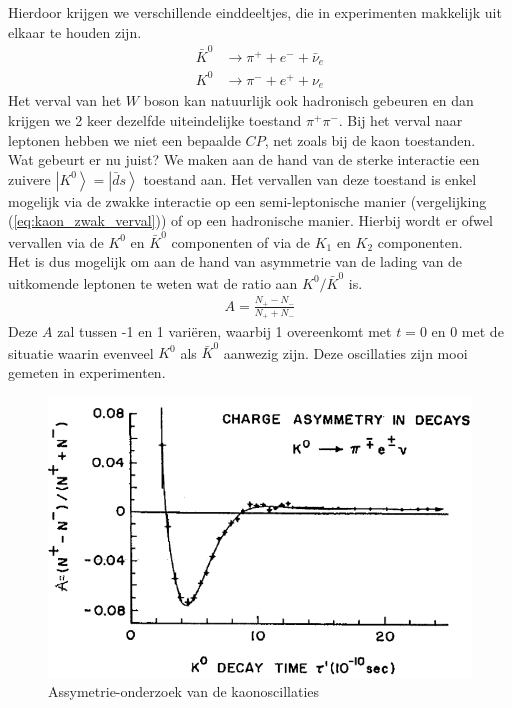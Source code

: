 \documentclass[../main.tex]{subfiles}
\begin{document}
Hierdoor krijgen we verschillende einddeeltjes, die in experimenten makkelijk uit elkaar te houden zijn.
\begin{equation}
    \begin{aligned}
        \label{eq:kaon_zwak_verval}
        \bar{K}^{0} &\rightarrow \pi^{+}+e^{-}+\bar{\nu}_{e} \\
        K^{0} &\rightarrow \pi^{-}+e^{+}+\nu_{e}
    \end{aligned}
\end{equation}
Het verval van het $W$ boson kan natuurlijk ook hadronisch gebeuren en dan krijgen we 2 keer dezelfde uiteindelijke toestand $\pi^+\pi^-$. Bij het verval naar leptonen hebben we niet een bepaalde $CP$, net zoals bij de kaon toestanden.\\
Wat gebeurt er nu juist? We maken aan de hand van de sterke interactie een zuivere $\left|K^0\right>=\left|\bar{d}s\right>$ toestand aan. Het vervallen van deze toestand is enkel mogelijk via de zwakke interactie op een semi-leptonische manier (vergelijking (\ref{eq:kaon_zwak_verval})) of op een hadronische manier. Hierbij wordt er ofwel vervallen via de $K^0$ en $\bar{K}^0$ componenten of via de $K_1$ en $K_2$ componenten.\\
Het is dus mogelijk om aan de hand van asymmetrie van de lading van de uitkomende leptonen te weten wat de ratio aan $K^0/\bar{K}^0$ is.
\begin{equation}
    \begin{aligned}
        \label{eq:lepton_lading_assymetrie}
        A=\frac{N_{+}-N_{-}}{N_{+}+N_{-}}
    \end{aligned}
\end{equation}
Deze $A$ zal tussen -1 en 1 variëren, waarbij 1 overeenkomt met $t=0$ en 0 met de situatie waarin evenveel $K^0$ als $\bar{K}^0$ aanwezig zijn. Deze oscillaties zijn mooi gemeten in experimenten.

\begin{figure}[h]
    \centering
    \includegraphics[width=0.5\linewidth]{meson_mixing_and_oscillations/kaon_osc_verval.png}
    \caption{Assymetrie-onderzoek van de kaonoscillaties}%
    \label{fig:meson_mixing_and_oscillations/kaon_osc_verval}
\end{figure}
\end{document}
